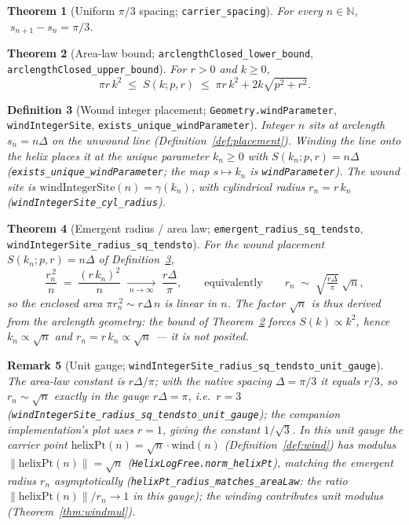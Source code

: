 \documentclass[11pt]{article}
\newtheorem{definition}{Definition}[section]
\newtheorem{theorem}[definition]{Theorem}
\newtheorem{remark}[definition]{Remark}
\newcommand{\N}{\mathbb{N}}
\newcommand{\code}[1]{\texttt{#1}}
\begin{document}
\begin{theorem}[Uniform $\pi/3$ spacing; \code{carrier\_spacing}]\label{thm:spacing}
For every $n\in\N$, $\;s_{n+1}-s_n=\pi/3$.
\end{theorem}

\begin{theorem}[Area-law bound; \code{arclengthClosed\_lower\_bound}, \code{arclengthClosed\_upper\_bound}]\label{thm:areabound}
For $r>0$ and $k\ge 0$,
\[
  \pi r\,k^2 \;\le\; S(k;p,r) \;\le\; \pi r\,k^2 + 2k\sqrt{p^2+r^2}.
\]
\end{theorem}

\begin{definition}[Wound integer placement; \code{Geometry.windParameter}, \code{windIntegerSite}, \code{exists\_unique\_windParameter}]\label{def:wound}
Integer $n$ sits at arclength $s_n=n\Delta$ on the unwound line (Definition~\ref{def:placement}).
\emph{Winding the line onto the helix} places it at the unique parameter $k_n\ge 0$ with
$S(k_n;p,r)=n\Delta$ (\code{exists\_unique\_windParameter}; the map $s\mapsto k_n$ is
\code{windParameter}). The wound site is $\mathrm{windIntegerSite}(n)=\gamma(k_n)$, with cylindrical
radius $r_n=r\,k_n$ (\code{windIntegerSite\_cyl\_radius}).
\end{definition}

\begin{theorem}[Emergent radius / area law; \code{emergent\_radius\_sq\_tendsto}, \code{windIntegerSite\_radius\_sq\_tendsto}]\label{thm:arealaw}
For the wound placement $S(k_n;p,r)=n\Delta$ of Definition~\ref{def:wound},
\[
  \frac{r_n^{\,2}}{n}\;=\;\frac{(r\,k_n)^2}{n}\;\xrightarrow[\;n\to\infty\;]{}\;\frac{r\Delta}{\pi},
  \qquad\text{equivalently}\qquad r_n\;\sim\;\sqrt{\tfrac{r\Delta}{\pi}}\;\sqrt n,
\]
so the enclosed area $\pi r_n^{\,2}\sim r\Delta\,n$ is linear in $n$. The factor $\sqrt n$ is thus
\emph{derived from the arclength geometry}: the bound of Theorem~\ref{thm:areabound} forces
$S(k)\propto k^2$, hence $k_n\propto\sqrt n$ and $r_n=r\,k_n\propto\sqrt n$ --- it is not posited.
\end{theorem}

\begin{remark}[Unit gauge; \code{windIntegerSite\_radius\_sq\_tendsto\_unit\_gauge}]\label{rem:gauge}
The area-law constant is $r\Delta/\pi$; with the native spacing $\Delta=\pi/3$ it equals $r/3$, so
$r_n\sim\sqrt n$ \emph{exactly} in the gauge $r\Delta=\pi$, i.e.\ $r=3$
(\code{windIntegerSite\_radius\_sq\_tendsto\_unit\_gauge}); the companion implementation's plot uses
$r=1$, giving the constant $1/\sqrt3$. In this unit gauge the carrier point
$\mathrm{helixPt}(n)=\sqrt n\cdot\mathrm{wind}(n)$ (Definition~\ref{def:wind}) has modulus
$\|\mathrm{helixPt}(n)\|=\sqrt n$ (\code{HelixLogFree.norm\_helixPt}), matching the emergent radius
$r_n$ asymptotically (\code{helixPt\_radius\_matches\_areaLaw}: the ratio
$\|\mathrm{helixPt}(n)\|/r_n\to 1$ in this gauge); the winding contributes unit modulus
(Theorem~\ref{thm:windmul}).
\end{remark}
\end{document}
